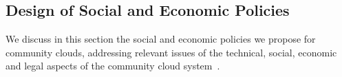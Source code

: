
\subsection{Design of Social and Economic Policies}
\label{sec:design}

We discuss in this section the social and economic policies we propose for community clouds, addressing relevant issues of the technical, social, economic and legal aspects of the community cloud system~\cite{Khan2014Sparks,Khan2014Macroeconomic}. 


